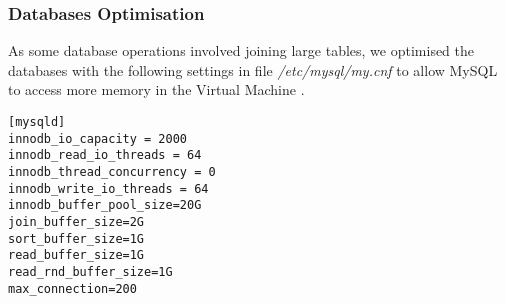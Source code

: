 \subsubsection{Databases Optimisation}
\par As some database operations involved joining large tables, we optimised the databases with the following settings in file \textit{/etc/mysql/my.cnf} to allow MySQL to access more memory in the Virtual Machine \cite{setting_innodb_buffer_pool_size,innodb_buffer}.

\begin{verbatim}
[mysqld]
innodb_io_capacity = 2000
innodb_read_io_threads = 64
innodb_thread_concurrency = 0
innodb_write_io_threads = 64
innodb_buffer_pool_size=20G
join_buffer_size=2G
sort_buffer_size=1G
read_buffer_size=1G
read_rnd_buffer_size=1G
max_connection=200
\end{verbatim}


